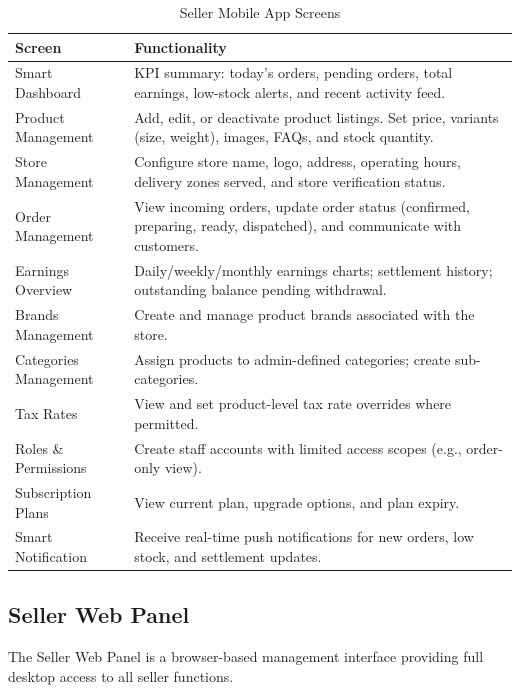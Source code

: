 \documentclass[12pt, a4paper, oneside]{report}
\begin{document}
\begin{table}[H]
\centering
\caption{Seller Mobile App Screens}
\label{tab:seller-app-screens}
\begin{tabularx}{\textwidth}{@{} L{3.6cm} X @{}}
\toprule
\textbf{Screen} & \textbf{Functionality} \\
\midrule
Smart Dashboard
  & KPI summary: today's orders, pending orders, total earnings, low-stock
    alerts, and recent activity feed. \\[4pt]
Product Management
  & Add, edit, or deactivate product listings. Set price, variants (size,
    weight), images, FAQs, and stock quantity. \\[4pt]
Store Management
  & Configure store name, logo, address, operating hours, delivery zones
    served, and store verification status. \\[4pt]
Order Management
  & View incoming orders, update order status (confirmed, preparing, ready,
    dispatched), and communicate with customers. \\[4pt]
Earnings Overview
  & Daily/weekly/monthly earnings charts; settlement history; outstanding
    balance pending withdrawal. \\[4pt]
Brands Management
  & Create and manage product brands associated with the store. \\[4pt]
Categories Management
  & Assign products to admin-defined categories; create sub-categories. \\[4pt]
Tax Rates
  & View and set product-level tax rate overrides where permitted. \\[4pt]
Roles \& Permissions
  & Create staff accounts with limited access scopes (e.g., order-only view). \\[4pt]
Subscription Plans
  & View current plan, upgrade options, and plan expiry. \\[4pt]
Smart Notification
  & Receive real-time push notifications for new orders, low stock, and
    settlement updates. \\
\bottomrule
\end{tabularx}
\end{table}

\subsection{Seller Web Panel}

The Seller Web Panel is a browser-based management interface providing full
desktop access to all seller functions.
\end{document}
